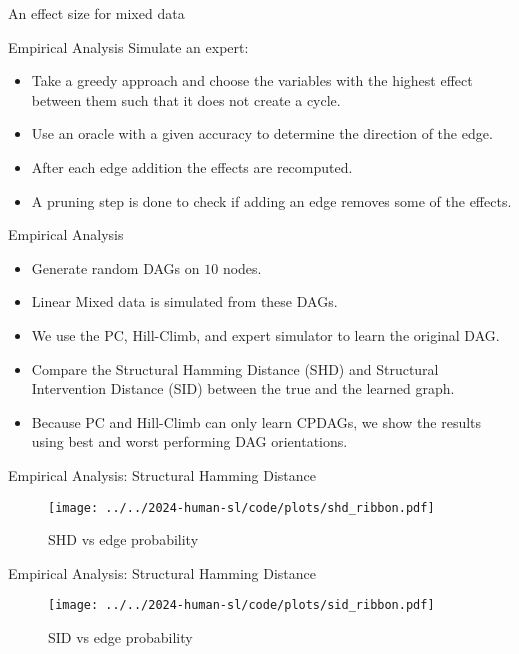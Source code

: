 \documentclass{beamer}
\begin{document}
\begin{frame}{An effect size for mixed data}
\end{frame}

\begin{frame}{Empirical Analysis}
	Simulate an expert:
	\begin{itemize}
		\item Take a greedy approach and choose the variables with the highest effect between them such that it does not create a cycle.
		\item Use an oracle with a given accuracy to determine the direction of the edge.
		\item After each edge addition the effects are recomputed.
		\item A pruning step is done to check if adding an edge removes some of the effects.
	\end{itemize}
\end{frame}

\begin{frame}{Empirical Analysis}
	\begin{itemize}
		\item Generate random DAGs on $10$ nodes.
		\item Linear Mixed data is simulated from these DAGs.
		\item We use the PC, Hill-Climb, and expert simulator to learn the original DAG.
		\item Compare the Structural Hamming Distance (SHD) and Structural Intervention Distance (SID) between the true and the learned graph.
		\item Because PC and Hill-Climb can only learn CPDAGs, we show the results using best and worst performing DAG orientations.
	\end{itemize}
\end{frame}


\begin{frame}{Empirical Analysis: Structural Hamming Distance}
	\begin{figure}
		\centering
		\texttt{[image: ../../2024-human-sl/code/plots/shd\_ribbon.pdf]}
		\caption{SHD vs edge probability}
	\end{figure}
\end{frame}

\begin{frame}{Empirical Analysis: Structural Hamming Distance}
	\begin{figure}
		\centering
		\texttt{[image: ../../2024-human-sl/code/plots/sid\_ribbon.pdf]}
		\caption{SID vs edge probability}
	\end{figure}
\end{frame}
\end{document}
